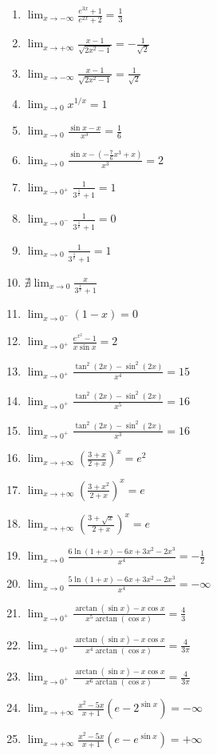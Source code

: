 \documentclass[11pt,a4paper]{article}
\begin{document}
\begin{enumerate}
\item $\displaystyle \lim_{x \to -\infty} \frac{e^{3x} + 1}{e^{2x} + 2} = \frac{1}{3}$
\item $\displaystyle \lim_{x \to +\infty} \frac{x - 1}{\sqrt{2x^{2} - 1}} = -\frac{1}{\sqrt{2}}$
\item $\displaystyle \lim_{x \to -\infty} \frac{x - 1}{\sqrt{2x^{2} - 1}} = \frac{1}{\sqrt{2}}$
\item $\displaystyle \lim_{x \to 0} x^{1/x} = 1$
\item $\displaystyle \lim_{x \to 0} \frac{\sin x - x}{x^{3}} = \frac{1}{6}$
\item $\displaystyle \lim_{x \to 0} \frac{\sin x - \left(-\frac{7}{6}x^{3} + x\right)}{x^{3}} = 2$
\item $\displaystyle \lim_{x \to 0^{+}} \frac{1}{3^{\frac{1}{x}} + 1} = 1$
\item $\displaystyle \lim_{x \to 0^{-}} \frac{1}{3^{\frac{1}{x}} + 1} = 0$
\item $\displaystyle \lim_{x \to 0} \frac{1}{3^{\frac{1}{x}} + 1} = 1$
\item $\displaystyle \nexists \lim_{x \to 0} \frac{x}{3^{\frac{1}{x}} + 1}$
\item $\displaystyle \lim_{x \to 0^{-}} \left(1 - x\right) = 0$
\item $\displaystyle \lim_{x \to 0^{+}} \frac{e^{x^{2}} - 1}{x\sin x} = 2$
\item $\displaystyle \lim_{x \to 0^{+}} \frac{\tan^{2}(2x) - \sin^{2}(2x)}{x^{4}} = 15$
\item $\displaystyle \lim_{x \to 0^{+}} \frac{\tan^{2}(2x) - \sin^{2}(2x)}{x^{5}} = 16$
\item $\displaystyle \lim_{x \to 0^{+}} \frac{\tan^{2}(2x) - \sin^{2}(2x)}{x^{3}} = 16$
\item $\displaystyle \lim_{x \to +\infty} \left(\frac{3 + x}{2 + x}\right)^{x} = e^{2}$
\item $\displaystyle \lim_{x \to +\infty} \left(\frac{3 + x^{2}}{2 + x}\right)^{x} = e$
\item $\displaystyle \lim_{x \to +\infty} \left(\frac{3 + \sqrt{x}}{2 + x}\right)^{x} = e$
\item $\displaystyle \lim_{x \to 0} \frac{6\ln(1 + x) - 6x + 3x^{2} - 2x^{3}}{x^{4}} = -\frac{1}{2}$
\item $\displaystyle \lim_{x \to 0} \frac{5\ln(1 + x) - 6x + 3x^{2} - 2x^{3}}{x^{4}} = -\infty$
\item $\displaystyle \lim_{x \to 0^{+}} \frac{\arctan(\sin x) - x\cos x}{x^{5}\arctan(\cos x)} = \frac{4}{3}$
\item $\displaystyle \lim_{x \to 0^{+}} \frac{\arctan(\sin x) - x\cos x}{x^{4}\arctan(\cos x)} = \frac{4}{3\pi}$
\item $\displaystyle \lim_{x \to 0^{+}} \frac{\arctan(\sin x) - x\cos x}{x^{6}\arctan(\cos x)} = \frac{4}{3\pi}$
\item $\displaystyle \lim_{x \to +\infty} \frac{x^{2} - 5x}{x + 1}\left(e - 2^{\sin x}\right) = -\infty$
\item $\displaystyle \lim_{x \to +\infty} \frac{x^{2} - 5x}{x + 1}\left(e - e^{\sin x}\right) = +\infty$
\end{enumerate}
\end{document}
